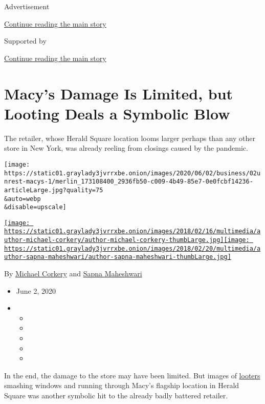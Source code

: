 Advertisement

\protect\hyperlink{after-top}{Continue reading the main story}

Supported by

\protect\hyperlink{after-sponsor}{Continue reading the main story}

\hypertarget{macys-damage-is-limited-but-looting-deals-a-symbolic-blow}{%
\section{Macy's Damage Is Limited, but Looting Deals a Symbolic
Blow}\label{macys-damage-is-limited-but-looting-deals-a-symbolic-blow}}

The retailer, whose Herald Square location looms larger perhaps than any
other store in New York, was already reeling from closings caused by the
pandemic.

\texttt{[image: https://static01.graylady3jvrrxbe.onion/images/2020/06/02/business/02unrest-macys-1/merlin\_173108400\_2936fb50-c009-4b49-85e7-0e0fcbf14236-articleLarge.jpg?quality=75\\\&auto=webp\\\&disable=upscale]}

\href{https://www.nytimes3xbfgragh.onion/by/michael-corkery}{\texttt{[image: https://static01.graylady3jvrrxbe.onion/images/2018/02/16/multimedia/author-michael-corkery/author-michael-corkery-thumbLarge.jpg]}}\href{https://www.nytimes3xbfgragh.onion/by/sapna-maheshwari}{\texttt{[image: https://static01.graylady3jvrrxbe.onion/images/2018/02/20/multimedia/author-sapna-maheshwari/author-sapna-maheshwari-thumbLarge.jpg]}}

By \href{https://www.nytimes3xbfgragh.onion/by/michael-corkery}{Michael
Corkery} and
\href{https://www.nytimes3xbfgragh.onion/by/sapna-maheshwari}{Sapna
Maheshwari}

\begin{itemize}
\item
  June 2, 2020
\item
  \begin{itemize}
  \item
  \item
  \item
  \item
  \item
  \end{itemize}
\end{itemize}

In the end, the damage to the store may have been limited. But images of
\href{https://www.nytimes3xbfgragh.onion/2020/06/02/nyregion/nyc-looting-protests-nypd.html}{looters}
smashing windows and running through Macy's flagship location in Herald
Square was another symbolic hit to the already badly battered retailer.

